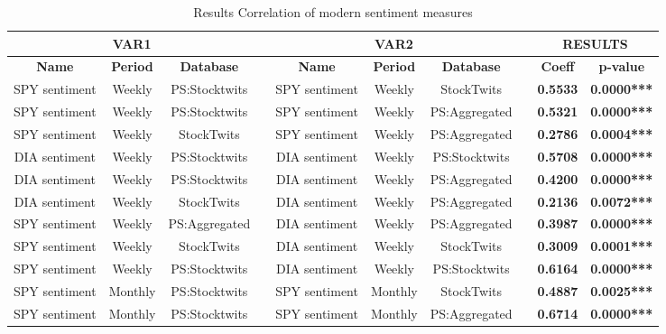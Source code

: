 \begin{table}[htbp]
  \centering
  \caption{Results Correlation of modern sentiment measures}
    \begin{tabular}{cccccccccc}
    \multicolumn{3}{c}{\textbf{VAR1}} &       & \multicolumn{3}{c}{\textbf{VAR2}} &       & \multicolumn{2}{c}{\textbf{RESULTS}} \\
    \midrule
    \textbf{Name} & \textbf{Period} & \textbf{Database} &       & \textbf{Name} & \textbf{Period} & \textbf{Database} &       & \textbf{Coeff} & \textbf{p-value} \\
    \midrule
    SPY sentiment & Weekly & PS:Stocktwits  &       & SPY sentiment & Weekly & StockTwits     &       & \textbf{0.5533} & \textbf{0.0000***} \\
    SPY sentiment & Weekly & PS:Stocktwits  &       & SPY sentiment & Weekly & PS:Aggregated  &       & \textbf{0.5321} & \textbf{0.0000***} \\
    SPY sentiment & Weekly & StockTwits     &       & SPY sentiment & Weekly & PS:Aggregated  &       & \textbf{0.2786} & \textbf{0.0004***} \\
    DIA sentiment & Weekly & PS:Stocktwits  &       & DIA sentiment & Weekly & PS:Stocktwits  &       & \textbf{0.5708} & \textbf{0.0000***} \\
    DIA sentiment & Weekly & PS:Stocktwits  &       & DIA sentiment & Weekly & PS:Aggregated  &       & \textbf{0.4200} & \textbf{0.0000***} \\
    DIA sentiment & Weekly & StockTwits     &       & DIA sentiment & Weekly & PS:Aggregated  &       & \textbf{0.2136} & \textbf{0.0072***} \\
    SPY sentiment & Weekly & PS:Aggregated  &       & DIA sentiment & Weekly & PS:Aggregated  &       & \textbf{0.3987} & \textbf{0.0000***} \\
    SPY sentiment & Weekly & StockTwits     &       & DIA sentiment & Weekly & StockTwits     &       & \textbf{0.3009} & \textbf{0.0001***} \\
    SPY sentiment & Weekly & PS:Stocktwits  &       & DIA sentiment & Weekly & PS:Stocktwits  &       & \textbf{0.6164} & \textbf{0.0000***} \\
    SPY sentiment & Monthly & PS:Stocktwits &       & SPY sentiment & Monthly & StockTwits    &       & \textbf{0.4887} & \textbf{0.0025***} \\
    SPY sentiment & Monthly & PS:Stocktwits &       & SPY sentiment & Monthly & PS:Aggregated &       & \textbf{0.6714} & \textbf{0.0000***} \\

\end{tabular}
\end{table}
